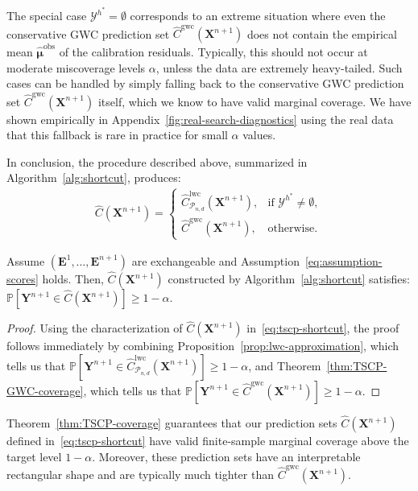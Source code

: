 The special case $\mathcal{Y}^{h^*} = \emptyset$ corresponds to an extreme situation where even the conservative GWC prediction set $\hat{C}^\mathrm{gwc}(\mathbf{X}^{n+1})$ does not contain the empirical mean $\hat{\boldsymbol\mu}^\mathrm{obs}$ of the calibration residuals. Typically, this should not occur at moderate miscoverage levels $\alpha$, unless the data are extremely heavy-tailed. Such cases can be handled by simply falling back to the conservative GWC prediction set $\hat{C}^\mathrm{gwc}(\mathbf{X}^{n+1})$ itself, which we know to have valid marginal coverage. 
We have shown empirically in Appendix~\ref{fig:real-search-diagnostics} using the real data that this fallback is rare in practice for small $\alpha$ values.

In conclusion, the procedure described above, summarized in Algorithm~\ref{alg:shortcut}, produces:
\begin{align} \label{eq:tscp-shortcut}
  \hat{C}(\mathbf{X}^{n+1}) = \begin{cases}
  \hat{C}^\mathrm{lwc}_{\mathcal{P}_{n,d}}(\mathbf{X}^{n+1}), &\text{if }\mathcal{Y}^{h^*} \neq \emptyset, \\
\hat{C}^\mathrm{gwc}(\mathbf{X}^{n+1}), &\text{otherwise.}
\end{cases}
\end{align}
\begin{theorem} \label{thm:TSCP-coverage}
Assume $(\mathbf{E}^1,\ldots,\mathbf{E}^{n+1})$ are exchangeable and Assumption~\ref{eq:assumption-scores} holds.
Then, $\hat{C}(\mathbf{X}^{n+1})$ constructed by Algorithm~\ref{alg:shortcut} satisfies: $\mathbb{P}[ \mathbf{Y}^{n+1} \in \hat{C}(\mathbf{X}^{n+1}) ] \ge 1 - \alpha$.
\end{theorem}
\begin{proof}
Using the characterization of $\hat{C}(\mathbf{X}^{n+1})$ in~\eqref{eq:tscp-shortcut}, the proof follows immediately by combining Proposition~\ref{prop:lwc-approximation}, which tells us that $\mathbb{P}[ \mathbf{Y}^{n+1} \in \hat{C}^{\mathrm{lwc}}_{\mathcal{P}_{n,d}}(\mathbf{X}^{n+1}) ] \ge 1 - \alpha$, and Theorem~\ref{thm:TSCP-GWC-coverage}, which tells us that $\mathbb{P}[ \mathbf{Y}^{n+1} \in \hat{C}^{\mathrm{gwc}}(\mathbf{X}^{n+1}) ] \ge 1 - \alpha$.
\end{proof}

Theorem~\ref{thm:TSCP-coverage} guarantees that our prediction sets $\hat{C}(\mathbf{X}^{n+1})$ defined in~\eqref{eq:tscp-shortcut} have valid finite-sample marginal coverage above the target level $1-\alpha$.
Moreover, these prediction sets have an interpretable rectangular shape and are typically much tighter than $\hat{C}^\mathrm{gwc}(\mathbf{X}^{n+1})$.



